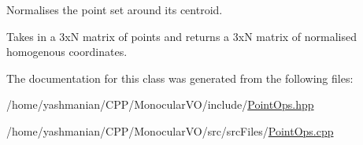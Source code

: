 Normalises the point set around its centroid. 

Takes in a 3xN matrix of points and returns a 3xN matrix of normalised homogenous coordinates. 

The documentation for this class was generated from the following files\+:\begin{DoxyCompactItemize}
\item 
/home/yashmanian/\+C\+P\+P/\+Monocular\+V\+O/include/\hyperlink{_point_ops_8hpp}{Point\+Ops.\+hpp}\item 
/home/yashmanian/\+C\+P\+P/\+Monocular\+V\+O/src/src\+Files/\hyperlink{_point_ops_8cpp}{Point\+Ops.\+cpp}\end{DoxyCompactItemize}
